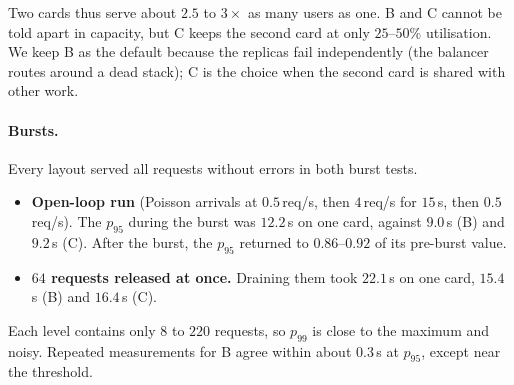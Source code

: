 \documentclass[11pt,a4paper]{article}
\begin{document}
\noindent Two cards thus serve about $2.5$ to $3\times$ as many users as one. B and C cannot be told apart in capacity, but C keeps the second card at only $25$--$50\%$ utilisation. We keep B as the default because the replicas fail independently (the balancer routes around a dead stack); C is the choice when the second card is shared with other work.

\paragraph{Bursts.} Every layout served all requests without errors in both burst tests.
\begin{itemize}[leftmargin=*]
\item \textbf{Open-loop run} (Poisson arrivals at $0.5$\,req/s, then $4$\,req/s for $15$\,s, then $0.5$\,req/s). The $p_{95}$ during the burst was $12.2$\,s on one card, against $9.0$\,s (B) and $9.2$\,s (C). After the burst, the $p_{95}$ returned to $0.86$--$0.92$ of its pre-burst value.
\item \textbf{$64$ requests released at once.} Draining them took $22.1$\,s on one card, $15.4$\,s (B) and $16.4$\,s (C).
\end{itemize}
Each level contains only $8$ to $220$ requests, so $p_{99}$ is close to the maximum and noisy. Repeated measurements for B agree within about $0.3$\,s at $p_{95}$, except near the threshold.
\end{document}
